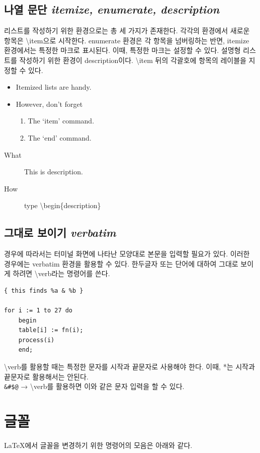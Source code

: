 \documentclass[a4paper, titlepage]{article}
\begin{document}
\subsection{나열 문단 \emph{itemize, enumerate, description}}
리스트를 작성하기 위한 환경으로는 총 세 가지가 존재한다. 각각의 환경에서 새로운 항목은 \textbackslash item으로 시작한다. enumerate 환경은 각 항목을 넘버링하는 반면, itemize 환경에서는 특정한 마크로 표시된다. 이때, 특정한 마크는 설정할 수 있다.
설명형 리스트를 작성하기 위한 환경이 description이다. \textbackslash item 뒤의 각괄호에 항목의 레이블을 지정할 수 있다. 
\begin{itemize}
\item Itemized lists are handy. 
\item However, don't forget
    \begin{enumerate}
    \item The `item' command.
    \item The `end' command.
    \end{enumerate} 
\end{itemize}
\begin{description}
\item [What] This is description.
\item [How] type \textbackslash begin\{description\} 
\end{description}

\subsection{그대로 보이기 \emph{verbatim}}
경우에 따라서는 터미널 화면에 나타난 모양대로 본문을 입력할 필요가 있다. 
이러한 경우에는 verbatim 환경을 활용할 수 있다. 한두글자 또는 단어에 대하여 그대로 보이게 하려면 \textbackslash verb라는 명령어를 쓴다. 
\begin{verbatim}
{ this finds %a & %b }

for i := 1 to 27 do 
    begin 
    table[i] := fn(i);
    process(i)
    end;
\end{verbatim}
\textbackslash verb를 활용할 때는 특정한 문자를 시작과 끝문자로 사용해야 한다. 이때, *는 시작과 끝문자로 활용해서는 안된다. 
\\ \verb+&#$@+ → \textbackslash verb를 활용하면 이와 같은 문자 입력을 할 수 있다.

\section{글꼴}
\LaTeX{}에서 글꼴을 변경하기 위한 명령어의 모음은 아래와 같다.
\end{document}
